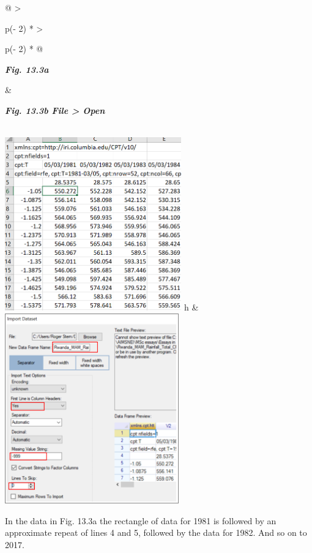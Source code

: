 \documentclass[
  letterpaper,
  DIV=11,
  numbers=noendperiod]{scrreprt}
\begin{document}
\begin{longtable}[]{@{}
  >{\raggedright\arraybackslash}p{(\columnwidth - 2\tabcolsep) * }
  >{\raggedright\arraybackslash}p{(\columnwidth - 2\tabcolsep) * }@{}}
\toprule\noalign{}
\begin{minipage}[b]{\linewidth}\raggedright
\textbf{\emph{Fig. 13.3a}}
\end{minipage} & \begin{minipage}[b]{\linewidth}\raggedright
\textbf{\emph{Fig. 13.3b File \textgreater{} Open}}
\end{minipage} \\
\midrule\noalign{}
\endhead
\bottomrule\noalign{}
\endlastfoot
\includegraphics[width=3.00471in,height=2.94802in]{figures/Fig13.3a.png}
h &
\includegraphics[width=2.95945in,height=\textheight]{figures/Fig13.3b.png} \\
\end{longtable}

In the data in Fig. 13.3a the rectangle of data for 1981 is followed by
an approximate repeat of lines 4 and 5, followed by the data for 1982.
And so on to 2017.
\end{document}
